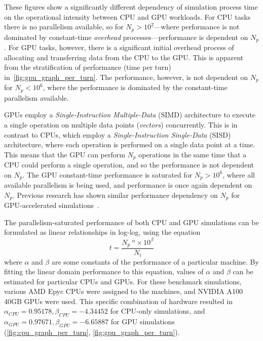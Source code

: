 \documentclass[a4paper,twoside,11pt]{report}
\begin{document}
These figures show a significantly different dependency of simulation process time on the operational intensity between CPU and GPU workloads. For CPU tasks there is no parallelism available, so for $N_p>10^2$---where performance is not dominated by constant-time \textit{overhead} processes---performance is dependent on $N_p$. For GPU tasks, however, there is a significant initial overhead process of allocating and transferring data from the CPU to the GPU. This is apparent from the stratification of performance (time per turn) in~\autoref{fig:gpu_graph_per_turn}. The performance, however, is not dependent on $N_p$ for $N_p<10^6$, where the performance is dominated by the constant-time parallelism available.

GPUs employ a \textit{Single-Instruction Multiple-Data} (SIMD) architecture to execute a single operation on multiple data points (\textit{vectors}) concurrently. This is in contrast to CPUs, which employ a \textit{Single-Instruction Single-Data} (SISD) architecture, where each operation is performed on a single data point at a time. This means that the GPU can perform $N_p$ operations in the same time that a CPU could perform a single operation, and so the performance is not dependent on $N_p$. The GPU constant-time performance is saturated for $N_p>10^6$, where all available parallelism is being used, and performance is once again dependent on $N_p$. Previous research has shown similar performance dependency on $N_p$ for GPU-accelerated simulations~\cite{Hegglin:2239398}.

The parallelism-saturated performance of both CPU and GPU simulations can be formulated as linear relationships in log-log, using the equation
\begin{equation}
    t=\frac{N_p\ ^\alpha \times 10^\beta}{N_t}
\end{equation} where $\alpha$ and $\beta$ are some constants of the performance of a particular machine. By fitting the linear domain performance to this equation, values of $\alpha$ and $\beta$ can be estimated for particular CPUs and GPUs. For these benchmark simulations, various AMD Epyc CPUs were assigned to the machines, and NVIDIA A100 40GB GPUs were used. This specific combination of hardware resulted in $\alpha_{CPU} = 0.95178, \beta_{CPU}=-4.34452$ for CPU-only simulations, and $\alpha_{GPU}=0.97671, \beta_{GPU}=-6.65887$ for GPU simulations (\autoref{fig:cpu_graph_per_turn}, \autoref{fig:gpu_graph_per_turn}).
\end{document}
